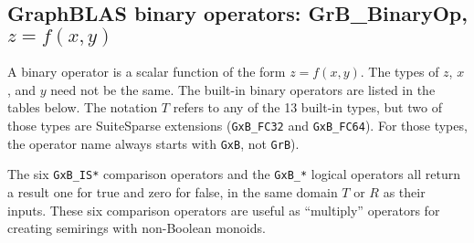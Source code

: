 \documentclass[12pt]{article}
\begin{document}
\newpage
\subsection{GraphBLAS binary operators: {\sf GrB\_BinaryOp}, $z=f(x,y)$} %
\label{binaryop}

A binary operator is a scalar function of the form $z=f(x,y)$.  The types of
$z$, $x$, and $y$ need not be the same.  The built-in binary operators are
listed in the tables below.  The notation $T$ refers to any of the 13
built-in types, but two of those types are SuiteSparse extensions
(\verb'GxB_FC32' and \verb'GxB_FC64').  For those types, the operator name
always starts with \verb'GxB', not \verb'GrB').

The six \verb'GxB_IS*' comparison operators and the \verb'GxB_*' logical operators all
return a result one for true and zero for false, in the same domain $T$ or $R$ as
their inputs.  These six comparison operators are useful as ``multiply''
operators for creating semirings with non-Boolean monoids.
\end{document}
